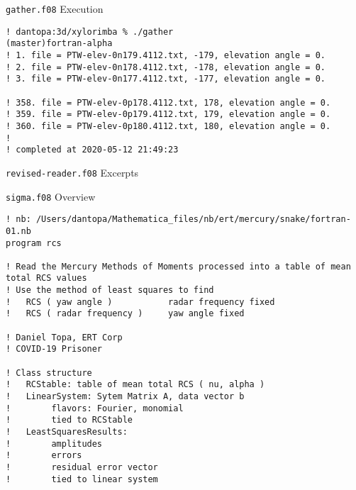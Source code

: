 \begin{frame} {\texttt{gather.f08} Execution}
\scriptsize
\begin{lstlisting}[style=terminal, breaklines=true, caption={Excerpt from \texttt{gather.f08}}, label={lst:gather-execution}]
! dantopa:3d/xylorimba % ./gather                                                                                                                             (master)fortran-alpha
! 1. file = PTW-elev-0n179.4112.txt, -179, elevation angle = 0.
! 2. file = PTW-elev-0n178.4112.txt, -178, elevation angle = 0.
! 3. file = PTW-elev-0n177.4112.txt, -177, elevation angle = 0.

! 358. file = PTW-elev-0p178.4112.txt, 178, elevation angle = 0.
! 359. file = PTW-elev-0p179.4112.txt, 179, elevation angle = 0.
! 360. file = PTW-elev-0p180.4112.txt, 180, elevation angle = 0.
!
! completed at 2020-05-12 21:49:23
\end{lstlisting}
\end{frame}

\begin{frame}{\texttt{revised-reader.f08} Excerpts}
\scriptsize



\end{frame}


\begin{frame}{\texttt{sigma.f08} Overview}
\scriptsize
\begin{lstlisting}[style=terminal, breaklines=true, caption={Excerpt from \texttt{sigma.f08}}, label={lst:sigma-overview}]
! nb: /Users/dantopa/Mathematica_files/nb/ert/mercury/snake/fortran-01.nb
program rcs

! Read the Mercury Methods of Moments processed into a table of mean total RCS values
! Use the method of least squares to find
!   RCS ( yaw angle )           radar frequency fixed
!   RCS ( radar frequency )     yaw angle fixed

! Daniel Topa, ERT Corp
! COVID-19 Prisoner

! Class structure
!   RCStable: table of mean total RCS ( nu, alpha )
!   LinearSystem: Sytem Matrix A, data vector b
!        flavors: Fourier, monomial
!        tied to RCStable
!   LeastSquaresResults:
!        amplitudes
!        errors
!        residual error vector
!        tied to linear system
\end{lstlisting}
\end{frame}

